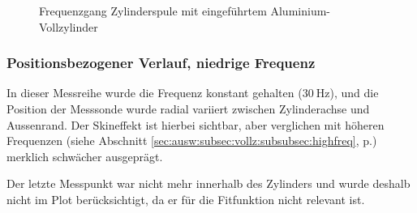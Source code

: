 \begin{figure}[h!]
    \resizebox{\textwidth}{!}{}
    \caption{Frequenzgang Zylinderspule mit eingef\"uhrtem Aluminium-Vollzylinder}
    \label{fig:alu:freq:exact}
\end{figure}



\clearpage
\subsubsection{Positionsbezogener Verlauf, niedrige Frequenz}
\label{sec:ausw:subsec:hohlz:subsubsec:steel}

In    dieser    Messreihe    wurde     die    Frequenz    konstant    gehalten
($\SI{30}{\hertz}$),     und    die     Position    der     Messsonde    wurde
radial    variiert    zwischen     Zylinderachse    und    Aussenrand.     Der
Skineffekt   ist    hierbei   sichtbar,   aber   verglichen    mit   h\"oheren
Frequenzen  (siehe  Abschnitt  \ref{sec:ausw:subsec:vollz:subsubsec:highfreq},
p.\pageref{sec:ausw:subsec:vollz:subsubsec:highfreq})   merklich   schw\"acher
ausgepr\"agt.

Der letzte Messpunkt war nicht mehr  innerhalb des Zylinders und wurde deshalb
nicht im  Plot ber\"ucksichtigt,  da er f\"ur  die Fitfunktion  nicht relevant
ist.

